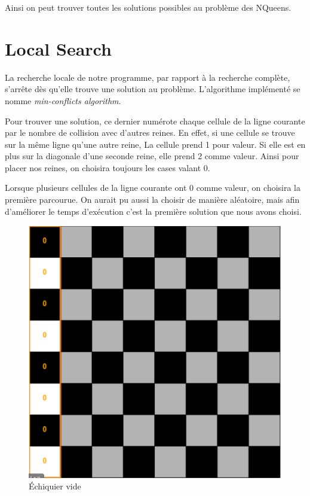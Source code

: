 \documentclass{article}
\begin{document}
Ainsi on peut trouver toutes les solutions possibles au problème des NQueens.


\section{Local Search}

La recherche locale de notre programme, par rapport à la recherche complète, s'arrête dès qu'elle trouve une solution au problème. L'algorithme implémenté se nomme
\emph{min-conflicts algorithm}. 

Pour trouver une solution, ce dernier numérote chaque cellule de la ligne courante par le nombre de collision avec d'autres reines. En effet, si une cellule se trouve sur la même ligne qu'une autre reine, La cellule prend 1 pour valeur. Si elle est en plus sur la diagonale d'une seconde reine, elle prend 2 comme valeur.
Ainsi pour placer nos reines, on choisira toujours les cases valant 0.

Lorsque plusieurs cellules de la ligne courante ont 0 comme valeur, on choisira la première parcourue. On aurait pu aussi la choisir de manière aléatoire, mais afin d'améliorer le temps d'exécution c'est la première solution que nous avons choisi. 


\begin{figure}[!h]
	\caption{\label{local1} Échiquier vide}
	\begin{center}
	\includegraphics[scale=0.3]{./picture/local1.png}
	\end{center}
\end{figure}
\end{document}

